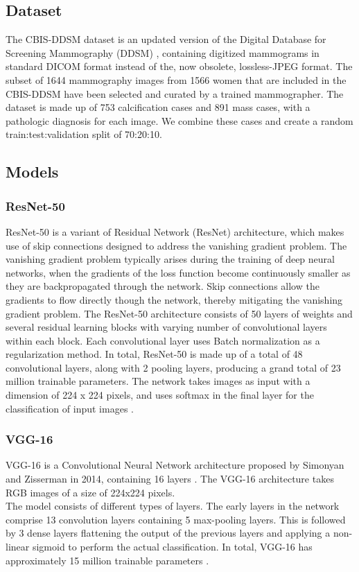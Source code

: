 \documentclass[sn-mathphys,Numbered]{sn-jnl}%
\theoremstyle{thmstyleone}%
\theoremstyle{thmstyletwo}%
\theoremstyle{thmstylethree}%
\begin{document}
\subsection{Dataset}\label{Dataset}
The CBIS-DDSM dataset \cite{Lee2017-hi} is an updated version of the Digital Database for Screening Mammography (DDSM) \cite{Heath2007THEDD}, containing digitized mammograms  in standard DICOM format instead of the, now obsolete, lossless-JPEG format. The subset of 1644 mammography images from 1566 women that are included in the CBIS-DDSM have been selected and curated by a trained mammographer. The dataset is made up of 753 calcification cases and 891 mass cases, with a pathologic diagnosis for each image. We combine these cases and create a random train:test:validation split of 70:20:10.

\subsection{Models}\label{Models}
\subsubsection{ResNet-50}\label{ResNet}
ResNet-50 is a variant of Residual Network (ResNet) architecture, which makes use of skip connections designed to address the vanishing gradient problem. The vanishing gradient problem typically arises during the training of deep neural networks, when the gradients of the loss function become continuously smaller as they are backpropagated through the network. Skip connections allow the gradients  to flow directly though the network, thereby mitigating the vanishing gradient problem. The ResNet-50 architecture consists of 50 layers of weights and several residual learning blocks with varying number of convolutional layers within each block. Each convolutional layer uses Batch normalization as a regularization method. In total, ResNet-50 is made up of a total of  48 convolutional layers, along with 2 pooling layers, producing a grand total of 23 million trainable parameters. The network takes images as input with a dimension of 224 x 224 pixels, and uses softmax in the final layer for the classification of input images \cite{he2015deep}.

\subsubsection{VGG-16}\label{VGG-16}
VGG-16 is a Convolutional Neural Network architecture proposed by Simonyan and Zisserman in 2014, containing 16 layers \cite{Alzubaidi_2021}.
The VGG-16 architecture takes RGB images of a size of 224x224 pixels.\\
The model consists of different types of layers. The early layers in the network comprise 13 convolution layers containing 5 max-pooling layers.
This is followed by 3 dense layers flattening the output of the previous layers and applying a non-linear sigmoid to perform the actual classification. In total, VGG-16 has approximately 15 million trainable parameters \cite{Rahdika_2020}.
\end{document}
